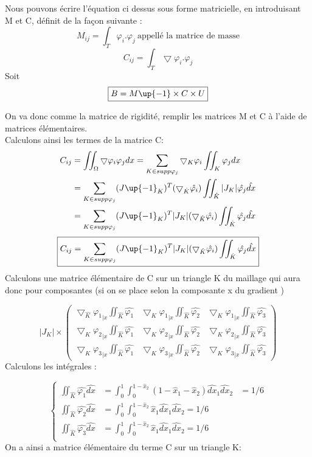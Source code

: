 \documentclass[a4paper,12pt,titlepage]{report}
\begin{document}
\begin{onehalfspace}
Nous pouvons écrire l'équation ci dessus sous forme matricielle, en introduisant M et C, définit de la façon suivante :
\[
		M_{ij}=\int_{T} \varphi_i.\varphi_j \ \text{appellé la matrice de masse}
\]
\[
		C_{ij}=\int_{T} \bigtriangledown\varphi_i.\varphi_j 
\]
Soit 
\[
	\boxed{B =M\up{-1}\times C \times U}
\]

On va donc comme la matrice de rigidité, remplir les matrices M et C à l'aide de matrices élémentaires. 
\\
Calculons ainsi les termes de la matrice C:
\[
\begin{aligned}
C_{ij} &= \iint_{\Omega}\bigtriangledown\varphi_i\varphi_j dx      
       = \sum_{K\in supp\varphi_j}\bigtriangledown_K\varphi_i \iint_{K} \varphi_jdx \\
	 &= \sum_{K\in supp\varphi_j}(J\up{-1}_K)^{T}(\bigtriangledown_{\hat{K}} \hat{\varphi_i})\iint_{\hat{K}}  |J_{K}| \hat{\varphi_j}\hat{dx} \\
	&= \sum_{K\in supp\varphi_j}(J\up{-1}_K)^{T}|J_K| (\bigtriangledown_{\hat{K} }\hat{\varphi_i})\iint_{\hat{K}}  \hat{\varphi_j}\hat{dx}
\end{aligned}
\]
\[\boxed{C_{ij} =  \sum_{K\in supp\varphi_j}(J\up{-1}_K)^{T}|J_K| (\bigtriangledown_{\hat{K} }\hat{\varphi_i})\iint_{\hat{K}}  \hat{\varphi_j}\hat{dx}} \]
Calculons une matrice élémentaire de C sur un triangle K du maillage qui aura donc pour composantes (si on se place selon la composante x du gradient ) 

\[
|J_K| \times
\begin{pmatrix}
   	\bigtriangledown_{\hat{K} }{\varphi_1}_{|x}\iint_{\hat{K}}  \hat{\varphi_1}&\bigtriangledown_{K}{\varphi_1}_{|x}\iint_{\hat{K} } \hat{\varphi_2} &\bigtriangledown_{K}{\varphi_1}_{|x}\iint_{\hat{K} } \hat{\varphi_3}\\ 
  \bigtriangledown_{K }{\varphi_2}_{|x}\iint_{\hat{K }} \hat{\varphi_1} & \bigtriangledown_{K }{\varphi_2}_{|x}\iint_{\hat{K} }\hat{\varphi_2} & \bigtriangledown_{K }{\varphi_2}_{|x}\iint_	{\hat{K} } \hat{\varphi_3} \\
  \bigtriangledown_{K }{\varphi_3}_{|x}\iint_{\hat{K} } \hat{\varphi_1}&\bigtriangledown_{K }{\varphi_3}_{|x}\iint_{\hat{K} } \hat{\varphi_2} & \bigtriangledown_{K}{\varphi_3}_{|x}\iint_{\hat{K} } \hat{\varphi_3}
\end{pmatrix} 
\]
Calculons les intégrales :


\[	
  \left\{
    \begin{aligned}
      \iint_{\hat{K}} \hat{\varphi_1}{\hat{dx}} &= \int_{0}^{1}\int_{0}^{1-{\hat{x}}_2} (1-{{\hat{x}}_1}-{{\hat{x}}_2}) \hat{dx}_1 \hat{dx}_2 &=1/6\\
      \iint_{\hat{K} } \hat{\varphi_2}\hat{dx} &= \int_{0}^{1}\int_{0}^{1-{\hat{x}}_2} {{\hat{x}}_1} \hat{dx}_1 \hat{dx}_2 =1/6\\
       \iint_{\hat{K} } \hat{\varphi_3}\hat{dx} &= \int_{0}^{1}\int_{0}^{1-{\hat{x}}_2} {{\hat{x}}_1} \hat{dx}_1 \hat{dx}_2 =1/6\\
    \end{aligned}
  \right.
\]
On a ainsi a matrice élémentaire du terme C sur un triangle K:


\end{onehalfspace}
\end{document}
